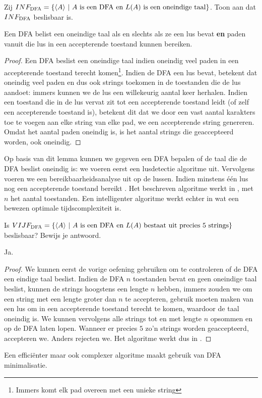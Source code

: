 \documentclass[a4paper]{article}
\begin{document}
\begin{question}
Zij $INF_{\rm DFA} = \{ \langle A \rangle \ | \ \text{$A$ is een DFA en $L(A)$ is een oneindige taal} \} $. Toon aan dat $INF_{\rm DFA}$ beslisbaar is.
\begin{answer}
\begin{lemma}
Een DFA belist een oneindige taal als en slechts als ze een lus bevat \textbf{en} paden vanuit die lus in een accepterende toestand kunnen bereiken.
\begin{proof}
Een DFA beslist een oneindige taal indien oneindig veel paden in een accepterende toestand terecht komen\footnote{Immers komt elk pad overeen met een unieke string}. Indien de DFA een lus bevat, betekent dat oneindig veel paden en dus ook strings toekomen in de toestanden die de lus aandoet: immers kunnen we de lus een willekeurig aantal keer herhalen. Indien een toestand die in de lus vervat zit tot een accepterende toestand leidt (of zelf een accepterende toestand is), betekent dit dat we door een vast aantal karakters toe te voegen aan elke string van elke pad, we een accepterende string genereren. Omdat het aantal paden oneindig is, is het aantal strings die geaccepteerd worden, ook oneindig.
\end{proof}
\end{lemma}
Op basis van dit lemma kunnen we gegeven een DFA bepalen of de taal die de DFA beslist oneindig is: we voeren eerst een lusdetectie algoritme uit. Vervolgens voeren we een bereikbaarheidsanalyse uit op de lussen. Indien minstens \'e\'en lus nog een accepterende toestand bereikt . Het beschreven algoritme werkt in , met $n$ het aantal toestanden. Een intelligenter algoritme werkt echter in  wat een bewezen optimale tijdscomplexiteit is.
\end{answer}
\end{question}

\begin{question}
Is $VIJF_{\rm DFA} = \{ \langle A \rangle \ | \ \text{$A$ is een DFA en $L(A)$ bestaat uit precies 5 strings} \} $ beslisbaar? Bewijs je antwoord.
\begin{answer}
Ja.
\begin{proof}
We kunnen eerst de vorige oefening gebruiken om te controleren of de DFA een eindige taal beslist. Indien de DFA $n$ toestanden bevat en geen oneindige taal beslist, kunnen de strings hoogstens een lengte $n$ hebben, immers zouden we om een string met een lengte groter dan $n$ te accepteren, gebruik moeten maken van een lus om in een accepterende toestand terecht te komen, waardoor de taal oneindig is. We kunnen vervolgens alle strings tot en met lengte $n$ opsommen en op de DFA laten lopen. Wanneer er precies $5$ zo'n strings worden geaccepteerd, accepteren we. Anders rejecten we. Het algoritme werkt dus in .
\end{proof}
\begin{note}
Een effici\"enter maar ook complexer algoritme maakt gebruik van DFA minimalisatie.
\end{note}
\end{answer}
\end{question}
\end{document}
